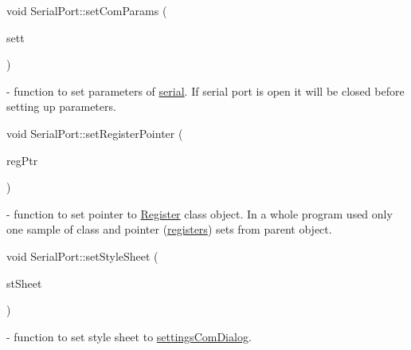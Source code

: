 \mbox{\label{classSerialPort_ab723ad9ecd8571d2156ad9b141cfd24e}} 
{\footnotesize\ttfamily void Serial\+Port\+::\texorpdfstring{set\+Com\+Params}{setComParams} (\begin{DoxyParamCaption}\item[{\mbox{\hyperlink{structComSettings}{Com\+Settings}}}]{sett }\end{DoxyParamCaption})\hspace{0.3cm}{\ttfamily [slot]}} - function to set parameters of \hyperlink{classSerialPort_a54120d9040537e637eae7e8c048dec31}{serial}. If serial port is open it will be closed before setting up parameters.

\mbox{\label{classSerialPort_a273c33e0eac534d7bdeafed79157e2e4}} 
{\footnotesize\ttfamily void Serial\+Port\+::\texorpdfstring{set\+Register\+Pointer}{setRegisterPointer} (\begin{DoxyParamCaption}\item[{\mbox{\hyperlink{classRegister}{Register}} $\ast$}]{reg\+Ptr }\end{DoxyParamCaption})} - function to set pointer to \hyperlink{classRegister}{Register} class object. In a whole program used only one sample of class and pointer (\hyperlink{classSerialPort_ab98c7d39235d59c2086d9f6e94c3ed4b}{registers}) sets from parent object. 

\mbox{\label{classSerialPort_a7dbba05770c1fd93db1026c0e5cc12a7}} 
{\footnotesize\ttfamily void Serial\+Port\+::\texorpdfstring{set\+Style\+Sheet}{setStyleSheet} (\begin{DoxyParamCaption}\item[{Q\+String}]{st\+Sheet }\end{DoxyParamCaption})\hspace{0.3cm}{\ttfamily [slot]}} - function to set style sheet to \hyperlink{classSerialPort_a9ab445f818748122d3368fd2e9dbbbea}{settings\+Com\+Dialog}.


